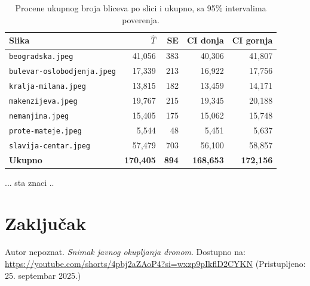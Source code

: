 \documentclass[a4paper,12pt]{article}
\begin{document}
\begin{table}[H]
\centering
\begin{tabular}{lrrrr}
\hline
Slika & $\hat T$ & SE & CI donja & CI gornja \\
\hline
\texttt{beogradska.jpeg}          & 41,056  & 383 & 40,306  & 41,807  \\
\texttt{bulevar-oslobodjenja.jpeg}& 17,339  & 213 & 16,922  & 17,756  \\
\texttt{kralja-milana.jpeg}       & 13,815  & 182 & 13,459  & 14,171  \\
\texttt{makenzijeva.jpeg}         & 19,767  & 215 & 19,345  & 20,188  \\
\texttt{nemanjina.jpeg}           & 15,405  & 175 & 15,062  & 15,748  \\
\texttt{prote-mateje.jpeg}        & 5,544   & 48  & 5,451   & 5,637   \\
\texttt{slavija-centar.jpeg}      & 57,479  & 703 & 56,100  & 58,857  \\
\hline
\textbf{Ukupno}                   & \textbf{170,405} & \textbf{894} & \textbf{168,653} & \textbf{172,156} \\
\hline
\end{tabular}
\caption{Procene ukupnog broja bliceva po slici i ukupno, sa 95\% intervalima poverenja.}
\label{tab:results}
\end{table}

... sta znaci ..

\section{Zaključak}


\newpage
\begin{thebibliography}{9}

	Autor nepoznat. 
	\textit{Snimak javnog okupljanja dronom}. 
	Dostupno na: \url{https://youtube.com/shorts/4pbj2aZAoP4?si=wxzp9pIkflD2CYKN} 
	(Pristupljeno: 25. septembar 2025.)
	
	\end{thebibliography}
\end{document}
